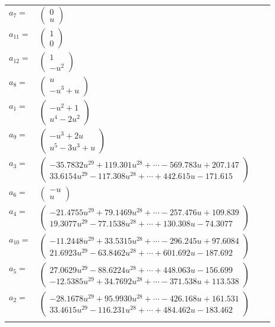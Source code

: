 \documentclass[1p]{elsarticle_modified}
\theoremstyle{definition}
\begin{document}
\begin{tabular}{m{7pt} m{180pt} m{7pt} m{180pt} }
\flushright $a_{7}=$&$\begin{pmatrix}0\\u\end{pmatrix}$ \\
\flushright $a_{11}=$&$\begin{pmatrix}1\\0\end{pmatrix}$ \\
\flushright $a_{12}=$&$\begin{pmatrix}1\\- u^2\end{pmatrix}$ \\
\flushright $a_{8}=$&$\begin{pmatrix}u\\- u^3+u\end{pmatrix}$ \\
\flushright $a_{1}=$&$\begin{pmatrix}- u^2+1\\u^4-2 u^2\end{pmatrix}$ \\
\flushright $a_{9}=$&$\begin{pmatrix}- u^3+2 u\\u^5-3 u^3+u\end{pmatrix}$ \\
\flushright $a_{3}=$&$\begin{pmatrix}-35.7832 u^{29}+119.301 u^{28}+\cdots-569.783 u+207.147\\33.6154 u^{29}-117.308 u^{28}+\cdots+442.615 u-171.615\end{pmatrix}$ \\
\flushright $a_{6}=$&$\begin{pmatrix}- u\\u\end{pmatrix}$ \\
\flushright $a_{4}=$&$\begin{pmatrix}-21.4755 u^{29}+79.1469 u^{28}+\cdots-257.476 u+109.839\\19.3077 u^{29}-77.1538 u^{28}+\cdots+130.308 u-74.3077\end{pmatrix}$ \\
\flushright $a_{10}=$&$\begin{pmatrix}-11.2448 u^{29}+33.5315 u^{28}+\cdots-296.245 u+97.6084\\21.6923 u^{29}-63.8462 u^{28}+\cdots+601.692 u-187.692\end{pmatrix}$ \\
\flushright $a_{5}=$&$\begin{pmatrix}27.0629 u^{29}-88.6224 u^{28}+\cdots+448.063 u-156.699\\-12.5385 u^{29}+34.7692 u^{28}+\cdots-371.538 u+113.538\end{pmatrix}$ \\
\flushright $a_{2}=$&$\begin{pmatrix}-28.1678 u^{29}+95.9930 u^{28}+\cdots-426.168 u+161.531\\33.4615 u^{29}-116.231 u^{28}+\cdots+484.462 u-183.462\end{pmatrix}$\\&\end{tabular}
\end{document}
